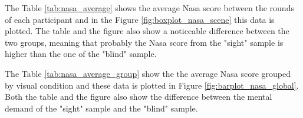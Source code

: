 The Table \ref{tab:nasa_average} shows the average Nasa score between the rounds of each participant and in the Figure \ref{fig:boxplot_nasa_scene} this data is plotted. The table and the figure also show a noticeable difference between the two groups, meaning that probably the Nasa score from the "sight" sample is higher than the one of the "blind" sample.



The Table \ref{tab:nasa_average_group} show the the average Nasa score grouped by visual condition and these data is plotted in Figure \ref{fig:barplot_nasa_global}. Both the table and the figure also show the difference between the mental demand of the "sight" sample and the "blind" sample.





